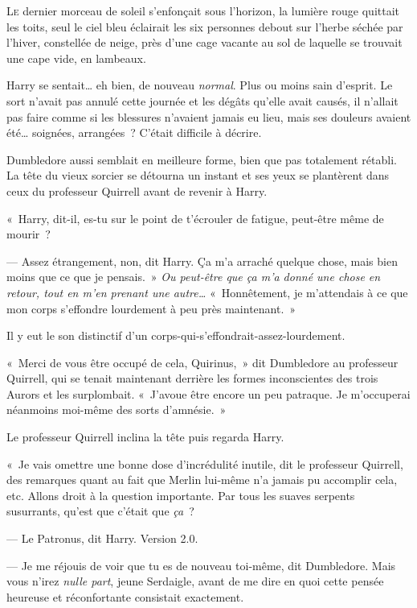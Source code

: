 
\lettrine{L}{e} dernier morceau de soleil s'enfonçait sous l'horizon, la lumière rouge quittait les toits, seul le ciel bleu éclairait les six personnes debout sur l'herbe séchée par l'hiver, constellée de neige, près d'une cage vacante au sol de laquelle se trouvait une cape vide, en lambeaux.

Harry se sentait… eh bien, de nouveau \emph{normal}. Plus ou moins sain d'esprit. Le sort n'avait pas annulé cette journée et les dégâts qu'elle avait causés, il n'allait pas faire comme si les blessures n'avaient jamais eu lieu, mais ses douleurs avaient été… soignées, arrangées~? C'était difficile à décrire.

Dumbledore aussi semblait en meilleure forme, bien que pas totalement rétabli. La tête du vieux sorcier se détourna un instant et ses yeux se plantèrent dans ceux du professeur Quirrell avant de revenir à Harry.

«~Harry, dit-il, es-tu sur le point de t'écrouler de fatigue, peut-être même de mourir~?

--- Assez étrangement, non, dit Harry. Ça m'a arraché quelque chose, mais bien moins que ce que je pensais.~» \emph{Ou peut-être que ça m'a donné une chose en retour, tout en m'en prenant une autre…} «~Honnêtement, je m'attendais à ce que mon corps s'effondre lourdement à peu près maintenant.~»

Il y eut le son distinctif d'un corps-qui-s'effondrait-assez-lourdement.

«~Merci de vous être occupé de cela, Quirinus,~» dit Dumbledore au professeur Quirrell, qui se tenait maintenant derrière les formes inconscientes des trois Aurors et les surplombait. «~J'avoue être encore un peu patraque. Je m'occuperai néanmoins moi-même des sorts d'amnésie.~»

Le professeur Quirrell inclina la tête puis regarda Harry.

«~Je vais omettre une bonne dose d'incrédulité inutile, dit le professeur Quirrell, des remarques quant au fait que Merlin lui-même n'a jamais pu accomplir cela, etc. Allons droit à la question importante. Par tous les suaves serpents susurrants, qu'est que c'était que \emph{ça}~?

--- Le Patronus, dit Harry. Version 2.0.

--- Je me réjouis de voir que tu es de nouveau toi-même, dit Dumbledore. Mais vous n'irez \emph{nulle part}, jeune Serdaigle, avant de me dire en quoi cette pensée heureuse et réconfortante consistait exactement.

